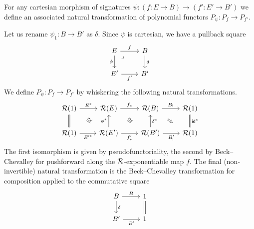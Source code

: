 \begin{definition}\label{def:cart-trans}
  For any cartesian morphism of signatures
  $\psi : (f : E \to B) \to (f' : E' \to B')$
  we define an associated natural transformation of polynomial functors
  $P_\psi : P_f \to P_{f'}$.

  Let us rename $\psi_1 : B \to B'$ as $\delta$.
  Since $\psi$ is cartesian, we have a pullback square
  \[ \begin{tikzcd}
    E & B \\
    {E'} & {B'}
    \arrow["f", from=1-1, to=1-2]
    \arrow["\phi"', from=1-1, to=2-1]
    \arrow["\lrcorner"{anchor=center, pos=0.125}, draw=none, from=1-1, to=2-2]
    \arrow["\delta", from=1-2, to=2-2]
    \arrow["{{f'}}"', from=2-1, to=2-2]
  \end{tikzcd}\]
  We define $P_\psi : P_f \to P_{f'}$ by whiskering the following natural transformations.
  \[\begin{tikzcd}
    {\RR(1)} & {\RR(E)} & {\RR(B)} & {\RR(1)} \\
    {\RR(1)} & {\RR(E')} & {\RR(B')} & {\RR(1)}
    \arrow["{{{E^*}}}", from=1-1, to=1-2]
    \arrow[equals, from=1-1, to=2-1]
    \arrow["\iso"{marking, allow upside down}, draw=none, from=1-1, to=2-2]
    \arrow["{{{f_*}}}", from=1-2, to=1-3]
    \arrow["\iso"{marking, allow upside down}, draw=none, from=1-2, to=2-3]
    \arrow["{{{B_!}}}", from=1-3, to=1-4]
    \arrow["\Rightarrow"{marking, allow upside down}, draw=none, from=1-3, to=2-4]
    \arrow["{{{E'^*}}}"', from=2-1, to=2-2]
    \arrow["{{{\phi^*}}}", from=2-2, to=1-2]
    \arrow["{{{f'_*}}}"', from=2-2, to=2-3]
    \arrow["{{{\delta^*}}}"', from=2-3, to=1-3]
    \arrow["{{{B'_!}}}"', from=2-3, to=2-4]
    \arrow["{{\id^*}}"', equals, from=2-4, to=1-4]
  \end{tikzcd}\]
  The first isomorphism is given by pseudofunctoriality,
  the second by Beck--Chevalley for pushforward along 
  the $\mathcal{R}$-exponentiable map $f$.
  The final (non-invertible)
  natural transformation is the Beck--Chevalley
  transformation for composition applied to the commutative square
  \[ \begin{tikzcd}
    B & 1 \\
    {B'} & 1
    \arrow["{{{B}}}", from=1-1, to=1-2]
    \arrow["{{{\delta}}}", from=1-1, to=2-1]
    \arrow["{{{B'}}}"', from=2-1, to=2-2]
    \arrow[equals, from=2-2, to=1-2]
  \end{tikzcd} \]
\end{definition}

